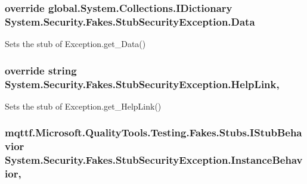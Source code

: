\hypertarget{class_system_1_1_security_1_1_fakes_1_1_stub_security_exception_a2fe7606eeac0de8de4bbbee0fcc31659}{
\subsubsection[{Data}]{\setlength{\rightskip}{0pt plus 5cm}override global.\-System.\-Collections.\-I\-Dictionary System.\-Security.\-Fakes.\-Stub\-Security\-Exception.\-Data\hspace{0.3cm}{\ttfamily [get]}}}\label{class_system_1_1_security_1_1_fakes_1_1_stub_security_exception_a2fe7606eeac0de8de4bbbee0fcc31659}


Sets the stub of Exception.\-get\-\_\-\-Data()

\hypertarget{class_system_1_1_security_1_1_fakes_1_1_stub_security_exception_a61c1b37913c6c6cf65c369560cbe247a}{
\subsubsection[{Help\-Link}]{\setlength{\rightskip}{0pt plus 5cm}override string System.\-Security.\-Fakes.\-Stub\-Security\-Exception.\-Help\-Link\hspace{0.3cm}{\ttfamily [get]}, {\ttfamily [set]}}}\label{class_system_1_1_security_1_1_fakes_1_1_stub_security_exception_a61c1b37913c6c6cf65c369560cbe247a}


Sets the stub of Exception.\-get\-\_\-\-Help\-Link()

\hypertarget{class_system_1_1_security_1_1_fakes_1_1_stub_security_exception_ad3c4f2950e27c7be73da3e885f64cfc0}{
\subsubsection[{Instance\-Behavior}]{\setlength{\rightskip}{0pt plus 5cm}mqttf.\-Microsoft.\-Quality\-Tools.\-Testing.\-Fakes.\-Stubs.\-I\-Stub\-Behavior System.\-Security.\-Fakes.\-Stub\-Security\-Exception.\-Instance\-Behavior\hspace{0.3cm}{\ttfamily [get]}, {\ttfamily [set]}}}\label{class_system_1_1_security_1_1_fakes_1_1_stub_security_exception_ad3c4f2950e27c7be73da3e885f64cfc0}


